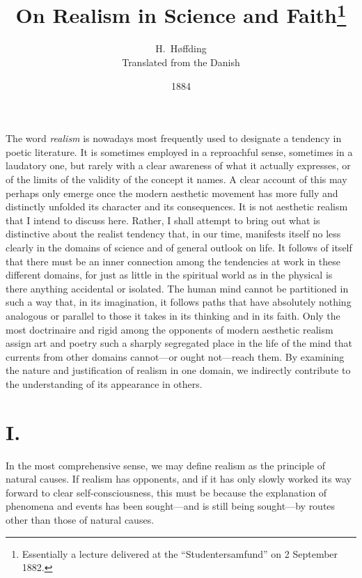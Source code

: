 \documentclass[12pt,a4paper]{article}
\title{\textbf{On Realism in Science and Faith}\footnote{Essentially a
lecture delivered at the ``Studentersamfund'' on 2 September 1882.}}
\author{H.\ Høffding\\[4pt]
  \small Translated from the Danish}
\date{1884}
\begin{document}
\maketitle
\thispagestyle{fancy}

\bigskip

The word \emph{realism} is nowadays most frequently used to designate a
tendency in poetic literature. It is sometimes employed in a reproachful
sense, sometimes in a laudatory one, but rarely with a clear awareness of
what it actually expresses, or of the limits of the validity of the concept
it names. A clear account of this may perhaps only emerge once the modern
aesthetic movement has more fully and distinctly unfolded its character
and its consequences. It is not aesthetic realism that I intend to discuss
here. Rather, I shall attempt to bring out what is distinctive about the
realist tendency that, in our time, manifests itself no less clearly in
the domains of science and of general outlook on life. It follows of itself
that there must be an inner connection among the tendencies at work in
these different domains, for just as little in the spiritual world as in
the physical is there anything accidental or isolated. The human mind
cannot be partitioned in such a way that, in its imagination, it follows
paths that have absolutely nothing analogous or parallel to those it takes
in its thinking and in its faith. Only the most doctrinaire and rigid among
the opponents of modern aesthetic realism assign art and poetry such a
sharply segregated place in the life of the mind that currents from other
domains cannot---or ought not---reach them. By examining the nature and
justification of realism in one domain, we indirectly contribute to the
understanding of its appearance in others.

\section*{I.}

In the most comprehensive sense, we may define realism as the principle
of natural causes. If realism has opponents, and if it has only slowly
worked its way forward to clear self-consciousness, this must be because
the explanation of phenomena and events has been sought---and is still
being sought---by routes other than those of natural causes.
\end{document}
